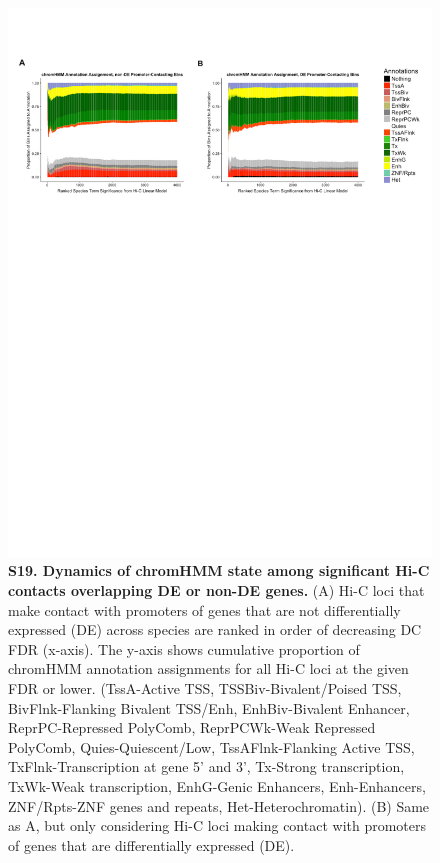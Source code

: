 \begin{figure}[!htb]
\centering
\includegraphics[width=6in]{img/figS19.pdf}
\caption[Dynamics of chromHMM state among significant Hi-C contacts overlapping DE or non-DE genes.]{\textbf{S19. Dynamics of chromHMM state among significant Hi-C contacts overlapping DE or non-DE genes.} (A) Hi-C loci that make contact with promoters of genes that are not differentially expressed (DE) across species are ranked in order of decreasing DC FDR (x-axis). The y-axis shows cumulative proportion of chromHMM annotation assignments for all Hi-C loci at the given FDR or lower. (TssA-Active TSS, TSSBiv-Bivalent/Poised TSS, BivFlnk-Flanking Bivalent TSS/Enh, EnhBiv-Bivalent Enhancer, ReprPC-Repressed PolyComb, ReprPCWk-Weak Repressed PolyComb, Quies-Quiescent/Low, TssAFlnk-Flanking Active TSS, TxFlnk-Transcription at gene 5' and 3', Tx-Strong transcription, TxWk-Weak transcription, EnhG-Genic Enhancers, Enh-Enhancers, ZNF/Rpts-ZNF genes and repeats, Het-Heterochromatin). (B) Same as A, but only considering Hi-C loci making contact with promoters of genes that are differentially expressed (DE).}
\label{fig:ch02-figS19}
\end{figure}

